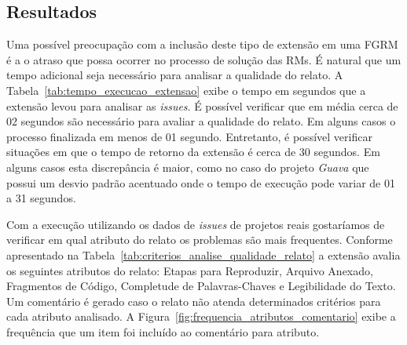 \subsection{Resultados}
\label{sub:implementacao_extensao_avaliacao_resultados}

Uma possível preocupação com a inclusão deste tipo de extensão em uma FGRM é a o
atraso que possa ocorrer no processo de solução das RMs. É natural que um tempo
adicional seja necessário para analisar a qualidade do relato. A
Tabela~\ref{tab:tempo_execucao_extensao} exibe o tempo em segundos que a
extensão levou para analisar as \textit{issues}. É possível verificar que em
média cerca de 02 segundos são necessário para avaliar a qualidade do relato. Em
alguns casos o processo finalizada em menos de 01 segundo. Entretanto, é
possível verificar situações em que o tempo de retorno da extensão é cerca de 30
segundos. Em alguns casos esta discrepância é maior, como no caso do projeto
\textit{Guava} que possui um desvio padrão acentuado onde o tempo de execução
pode variar de 01 a 31 segundos.

\begin{table}[htpb]
\centering
{}
\caption{Tempo de execução da extensão.}
\label{tab:tempo_execucao_extensao}
\end{table}

Com a execução utilizando os dados de \textit{issues} de projetos reais
gostaríamos de verificar em qual atributo do relato os problemas são mais
frequentes. Conforme apresentado na
Tabela~\ref{tab:criterios_analise_qualidade_relato} a extensão avalia os
seguintes atributos do relato: Etapas para Reproduzir, Arquivo Anexado,
Fragmentos de Código, Completude de Palavras-Chaves e Legibilidade do Texto. Um
comentário é gerado caso o relato não atenda determinados critérios para cada
atributo analisado. A Figura~\ref{fig:frequencia_atributos_comentario} exibe a
frequência que um item foi incluído ao comentário para atributo.

